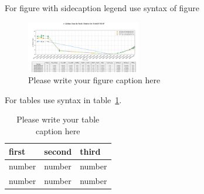 \documentclass{webofc}
\begin{document}
For figure with sidecaption legend use syntax of figure
\begin{figure}
\centering
\sidecaption
\includegraphics[width=5cm,clip]{figures/dqm_purmon_20190910_1.png}
\caption{Please write your figure caption here}
\label{fig-3}       %
\end{figure}

For tables use syntax in table~\ref{tab-1}.
\begin{table}
\centering
\caption{Please write your table caption here}
\label{tab-1}       %
\begin{tabular}{lll}
\hline
first & second & third  \\\hline
number & number & number \\
number & number & number \\\hline
\end{tabular}
\vspace*{5cm}  %
\end{table}
\end{document}
